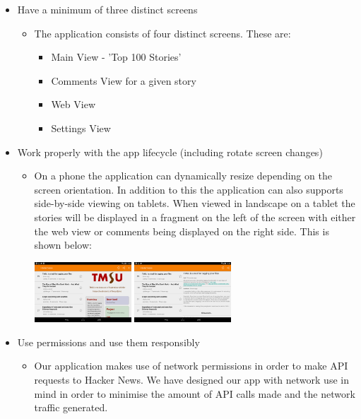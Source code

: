 \documentclass[11pt]{article}
\begin{document}
\begin{itemize}
	\item{Have a minimum of three distinct screens}
	\begin{itemize}
		\item{The application consists of four distinct screens. These are:}
		\begin{itemize}
			\item{Main View - 'Top 100 Stories'}
			\item{Comments View for a given story}
			\item{Web View}
			\item{Settings View}
		\end{itemize}
		\end{itemize}
		\item{Work properly with the app lifecycle (including rotate screen changes)}
		\begin{itemize}
			\item{On a phone the application can dynamically resize depending on the screen orientation. In addition to this the application can also supports side-by-side viewing on tablets. When viewed in landscape on a tablet the stories will be displayed in a fragment on the left of the screen with either the web view or comments being displayed on the right side. This is shown below:}
			\\
			\begin{center}
				\includegraphics[width=0.3\textwidth]{tabletWeb.png}
				\includegraphics[width=0.3\textwidth]{tabletComments.png}
			\end{center}
	\end{itemize}
	\item{Use permissions and use them responsibly}
	\begin{itemize}
		\item{Our application makes use of network permissions in order to make API requests to Hacker News. We have designed our app with network use in mind in order to minimise the amount of API calls made and the network traffic generated.}

\end{itemize}
\end{itemize}
\end{document}
